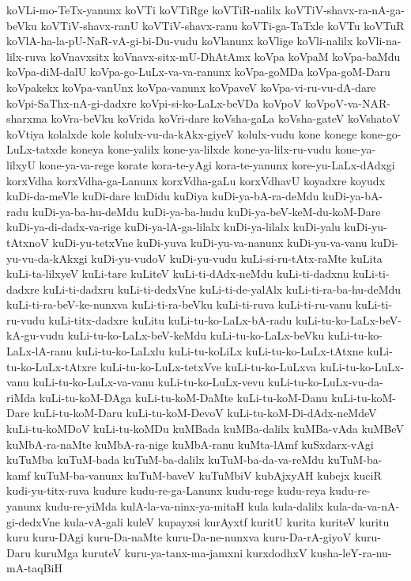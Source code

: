 {koVLi-mo-TeTx-yanunx
koVTi
koVTiRge
koVTiR-nalilx
koVTiV-shavx-ra-nA-ga-beVku
koVTiV-shavx-ranU
koVTiV-shavx-ranu
koVTi-ga-TaTxle
koVTu
koVTuR
koVlA-ha-la-pU-NaR-vA-gi-bi-Du-vudu
koVlanunx
koVlige
koVli-nalilx
koVli-na-lilx-ruva
koVnavxsitx
koVnavx-sitx-mU-DhAtAmx
koVpa
koVpaM
koVpa-baMdu
koVpa-diM-dalU
koVpa-go-LuLx-va-va-ranunx
koVpa-goMDa
koVpa-goM-Daru
koVpakekx
koVpa-vanUnx
koVpa-vanunx
koVpaveV
koVpa-vi-ru-vu-dA-dare
koVpi-SaThx-nA-gi-dadxre
koVpi-si-ko-LaLx-beVDa
koVpoV
koVpoV-va-NAR-sharxma
koVra-beVku
koVrida
koVri-dare
koVsha-gaLa
koVsha-gateV
koVshatoV
koVtiya
kolalxde
kole
kolulx-vu-da-kAkx-giyeV
kolulx-vudu
kone
konege
kone-go-LuLx-tatxde
koneya
kone-yalilx
kone-ya-lilxde
kone-ya-lilx-ru-vudu
kone-ya-lilxyU
kone-ya-va-rege
korate
kora-te-yAgi
kora-te-yanunx
kore-yu-LaLx-dAdxgi
korxVdha
korxVdha-ga-Lanunx
korxVdha-gaLu
korxVdhavU
koyadxre
koyudx
kuDi-da-meVle
kuDi-dare
kuDidu
kuDiya
kuDi-ya-bA-ra-deMdu
kuDi-ya-bA-radu
kuDi-ya-ba-hu-deMdu
kuDi-ya-ba-hudu
kuDi-ya-beV-keM-du-koM-Dare
kuDi-ya-di-dadx-va-rige
kuDi-ya-lA-ga-lilalx
kuDi-ya-lilalx
kuDi-yalu
kuDi-yu-tAtxnoV
kuDi-yu-tetxVne
kuDi-yuva
kuDi-yu-va-nanunx
kuDi-yu-va-vanu
kuDi-yu-vu-da-kAkxgi
kuDi-yu-vudoV
kuDi-yu-vudu
kuLi-si-ru-tAtx-raMte
kuLita
kuLi-ta-lilxyeV
kuLi-tare
kuLiteV
kuLi-ti-dAdx-neMdu
kuLi-ti-dadxnu
kuLi-ti-dadxre
kuLi-ti-dadxru
kuLi-ti-dedxVne
kuLi-ti-de-yalAlx
kuLi-ti-ra-ba-hu-deMdu
kuLi-ti-ra-beV-ke-nunxva
kuLi-ti-ra-beVku
kuLi-ti-ruva
kuLi-ti-ru-vanu
kuLi-ti-ru-vudu
kuLi-titx-dadxre
kuLitu
kuLi-tu-ko-LaLx-bA-radu
kuLi-tu-ko-LaLx-beV-kA-gu-vudu
kuLi-tu-ko-LaLx-beV-keMdu
kuLi-tu-ko-LaLx-beVku
kuLi-tu-ko-LaLx-lA-ranu
kuLi-tu-ko-LaLxlu
kuLi-tu-koLiLx
kuLi-tu-ko-LuLx-tAtxne
kuLi-tu-ko-LuLx-tAtxre
kuLi-tu-ko-LuLx-tetxVve
kuLi-tu-ko-LuLxva
kuLi-tu-ko-LuLx-vanu
kuLi-tu-ko-LuLx-va-vanu
kuLi-tu-ko-LuLx-vevu
kuLi-tu-ko-LuLx-vu-da-riMda
kuLi-tu-koM-DAga
kuLi-tu-koM-DaMte
kuLi-tu-koM-Danu
kuLi-tu-koM-Dare
kuLi-tu-koM-Daru
kuLi-tu-koM-DevoV
kuLi-tu-koM-Di-dAdx-neMdeV
kuLi-tu-koMDoV
kuLi-tu-koMDu
kuMBada
kuMBa-dalilx
kuMBa-vAda
kuMBeV
kuMbA-ra-naMte
kuMbA-ra-nige
kuMbA-ranu
kuMta-lAmf
kuSxdarx-vAgi
kuTuMba
kuTuM-bada
kuTuM-ba-dalilx
kuTuM-ba-da-va-reMdu
kuTuM-ba-kamf
kuTuM-ba-vanunx
kuTuM-baveV
kuTuMbiV
kubAjxyAH
kubejx
kuciR
kudi-yu-titx-ruva
kudure
kudu-re-ga-Lanunx
kudu-rege
kudu-reya
kudu-re-yanunx
kudu-re-yiMda
kulA-la-va-ninx-ya-mitaH
kula
kula-dalilx
kula-da-va-nA-gi-dedxVne
kula-vA-gali
kuleV
kupayxsi
kurAyxtf
kuritU
kurita
kuriteV
kuritu
kuru
kuru-DAgi
kuru-Da-naMte
kuru-Da-ne-nunxva
kuru-Da-rA-giyoV
kuru-Daru
kuruMga
kuruteV
kuru-ya-tanx-ma-jamxni
kurxdodhxV
kusha-leY-ra-nu-mA-taqBiH
}
